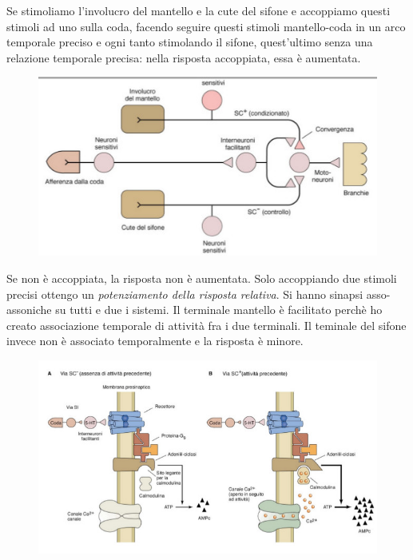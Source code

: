 \documentclass[a4paper,12pt]{article}
\begin{document}
Se stimoliamo l'involucro del mantello e la cute del sifone e accoppiamo questi stimoli ad uno sulla coda, facendo seguire questi stimoli mantello-coda in un arco temporale preciso e ogni tanto stimolando il sifone, quest'ultimo senza una relazione temporale precisa: nella risposta accoppiata, essa è aumentata. 

\begin{figure}[H]
\centering
\includegraphics[scale=0.4]{immagine/accoppiato.jpg}
\caption{}
\end{figure}


Se non è accoppiata, la risposta non è aumentata. Solo accoppiando due stimoli precisi ottengo un \emph{potenziamento della risposta relativa}. Si hanno sinapsi asso-assoniche su tutti e due i sistemi. Il terminale mantello è facilitato perchè ho creato associazione temporale di attività fra i due terminali. Il teminale del sifone invece non è associato temporalmente e la risposta è minore.


\begin{figure}[H]
\centering
\includegraphics[scale=0.4]{immagine/via.jpg}
\caption{}
\end{figure}
\end{document}
